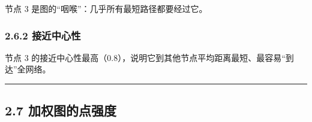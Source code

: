 节点 3 是图的``咽喉''：几乎所有最短路径都要经过它。

\subsubsection{2.6.2 接近中心性}\label{ux63a5ux8fd1ux4e2dux5fc3ux6027}

\begin{Shaded}
\begin{Highlighting}[]
\OperatorTok{=}
\NormalTok{(}
\end{Highlighting}
\end{Shaded}

\begin{Shaded}
\begin{Highlighting}[]
\end{Highlighting}
\end{Shaded}

节点 3
的接近中心性最高（0.8），说明它到其他节点平均距离最短、最容易``到达''全网络。

\begin{center}\rule{0.5\linewidth}{0.5pt}\end{center}

\subsection{2.7
加权图的点强度}\label{ux52a0ux6743ux56feux7684ux70b9ux5f3aux5ea6}

\begin{Shaded}
\begin{Highlighting}[]
\OperatorTok{=}
\NormalTok{Gw.add\_weighted\_edges\_from([(}\NormalTok{, }\NormalTok{, }\NormalTok{), (}\NormalTok{, }\NormalTok{, }\NormalTok{), (}\NormalTok{, }\NormalTok{, }\NormalTok{)])}
\NormalTok{(}\OperatorTok{=}\NormalTok{))}
\NormalTok{(}\OperatorTok{=}\NormalTok{))}
\end{Highlighting}
\end{Shaded}

